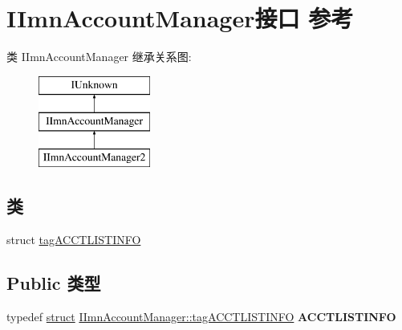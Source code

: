 \hypertarget{interface_i_imn_account_manager}{}\section{I\+Imn\+Account\+Manager接口 参考}
\label{interface_i_imn_account_manager}
类 I\+Imn\+Account\+Manager 继承关系图\+:\begin{figure}[H]
\begin{center}
\leavevmode
\includegraphics[height=3.000000cm]{interface_i_imn_account_manager}
\end{center}
\end{figure}
\subsection*{类}
\begin{DoxyCompactItemize}
\item 
struct \hyperlink{struct_i_imn_account_manager_1_1tag_a_c_c_t_l_i_s_t_i_n_f_o}{tag\+A\+C\+C\+T\+L\+I\+S\+T\+I\+N\+FO}
\end{DoxyCompactItemize}
\subsection*{Public 类型}
\begin{DoxyCompactItemize}
\item 
\mbox{\label{interface_i_imn_account_manager_a4a792f7273681247723093ef5515acf8}} 
typedef \hyperlink{interfacestruct}{struct} \hyperlink{struct_i_imn_account_manager_1_1tag_a_c_c_t_l_i_s_t_i_n_f_o}{I\+Imn\+Account\+Manager\+::tag\+A\+C\+C\+T\+L\+I\+S\+T\+I\+N\+FO} {\bfseries A\+C\+C\+T\+L\+I\+S\+T\+I\+N\+FO}
\end{DoxyCompactItemize}
